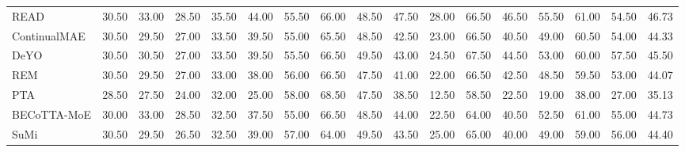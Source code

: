 \begin{table}[p]
{\begin{tabular}{lcccccccccccccccc}
READ & 30.50 & 33.00 & 28.50 & 35.50 & 44.00 & 55.50 & 66.00 & 48.50 & 47.50 & 28.00 & 66.50 & 46.50 & 55.50 & 61.00 & 54.50 & 46.73 \\
ContinualMAE & 30.50 & 29.50 & 27.00 & 33.50 & 39.50 & 55.00 & 65.50 & 48.50 & 42.50 & 23.00 & 66.50 & 40.50 & 49.00 & 60.50 & 54.00 & 44.33 \\
DeYO & 30.50 & 30.50 & 27.00 & 33.50 & 39.50 & 55.50 & 66.50 & 49.50 & 43.00 & 24.50 & 67.50 & 44.50 & 53.00 & 60.00 & 57.50 & 45.50 \\
REM & 30.50 & 29.50 & 27.00 & 33.00 & 38.00 & 56.00 & 66.50 & 47.50 & 41.00 & 22.00 & 66.50 & 42.50 & 48.50 & 59.50 & 53.00 & 44.07 \\
PTA & 28.50 & 27.50 & 24.00 & 32.00 & 25.00 & 58.00 & 68.50 & 47.50 & 38.50 & 12.50 & 58.50 & 22.50 & 19.00 & 38.00 & 27.00 & 35.13 \\
BECoTTA-MoE & 30.00 & 33.00 & 28.50 & 32.50 & 37.50 & 55.00 & 66.50 & 48.50 & 44.00 & 22.50 & 64.00 & 40.50 & 52.50 & 61.00 & 55.00 & 44.73 \\
SuMi & 30.50 & 29.50 & 26.50 & 32.50 & 39.00 & 57.00 & 64.00 & 49.50 & 43.50 & 25.00 & 65.00 & 40.00 & 49.00 & 59.00 & 56.00 & 44.40 \\
\bottomrule
\end{tabular}%
}
\end{table}

